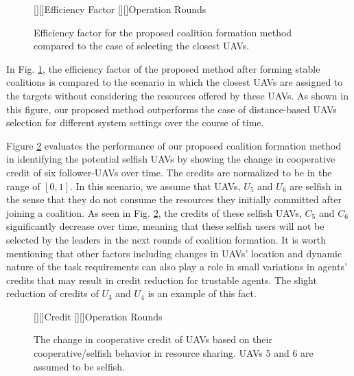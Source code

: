\documentclass[conference]{IEEEtran}
\theoremstyle{remark}
\theoremstyle{lemma}
\begin{document}
\begin{figure} [t]
    [][]{\Large{Efficiency Factor}}
    [][]{\Large{Operation Rounds}}
\vspace{-10pt}
     \centerline{}
    \caption{Efficiency factor for the proposed coalition formation method compared to the case of selecting the closest UAVs. }
    \label{fig:comparison}
\end{figure}
In Fig. \ref{fig:comparison}, the efficiency factor of the proposed method after forming stable coalitions  is compared to the scenario in which the closest UAVs are assigned to the targets without considering the resources offered by these UAVs. As shown in this figure, our proposed method outperforms the case of distance-based UAVs selection for different system settings over the course of time.

Figure \ref{fig:credit} evaluates the performance of our proposed coalition formation method in identifying the potential selfish UAVs by showing the change in cooperative credit of six follower-UAVs over time. The credits are normalized to be in the range of $[0,1]$. In this scenario, we assume that UAVs, $U_5$ and $U_6$ are selfish in the sense that they do not consume the resources they initially committed after joining a coalition. As seen in Fig. \ref{fig:credit}, the credits of these selfish UAVs, $C_5$ and $C_6$ significantly decrease over time, meaning that these selfish users will not be selected by the leaders in the next rounds of coalition formation. It is worth mentioning that other factors including changes in UAVs' location and dynamic nature of the task requirements can also play a role in small variations in agents' credits that may result in credit reduction for trustable agents. The slight reduction of credits of $U_3$ and $ U_4$ is an example of this fact.
\begin{figure} [t]
\vspace{-5pt}
    [][]{\Large{Credit}}
    [][]{\Large{Operation Rounds}}
     \centerline{}
    \caption{The change in cooperative credit of UAVs based on their cooperative/selfish behavior in resource sharing. UAVs 5 and 6 are assumed to be selfish.}
    \label{fig:credit}
\end{figure}
\end{document}
